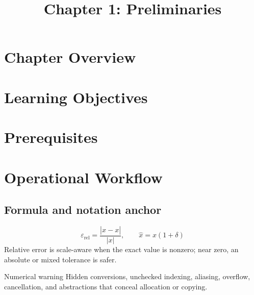 \documentclass[10pt,letterpaper]{article}
\title{Chapter 1: Preliminaries}
\author{}
\date{}
\begin{document}
\maketitle

\section*{Chapter Overview}


\section*{Learning Objectives}


\section*{Prerequisites}


\section*{Operational Workflow}


\subsection*{Formula and notation anchor}
\[
\varepsilon_{\mathrm{rel}}=\frac{|\widehat{x}-x|}{|x|},\qquad \widehat{x}=x(1+\delta)
\]
Relative error is scale-aware when the exact value is nonzero; near zero, an absolute or mixed tolerance is safer.

\begin{warnbox}{Numerical warning}
Hidden conversions, unchecked indexing, aliasing, overflow, cancellation, and abstractions that conceal allocation or copying.
\end{warnbox}
\end{document}
